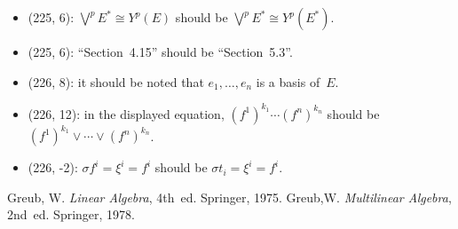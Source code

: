 \documentclass[letterpaper,12pt]{article}
\newcommand{\iso}{\cong}
\newcommand{\smprod}{\vee}
\newcommand{\bigsmprod}{\bigvee}
\begin{document}
\begin{itemize}
\item (225, 6): \(\bigsmprod^p E^*\iso Y^p(E)\) should be \(\bigsmprod^p E^*\iso Y^p(E^*)\).
\item (225, 6): ``Section~4.15'' should be ``Section~5.3''.
\item (226, 8): it should be noted that \(e_1,\ldots,e_n\) is a basis of~\(E\).
\item (226, 12): in the displayed equation, \((f^1)^{k_1}\cdots(f^n)^{k_n}\) should be \((f^1)^{k_1}\smprod\cdots\smprod(f^n)^{k_n}\).
\item (226, -2): \(\sigma f^i=\xi^i=f^i\) should be \(\sigma t_i=\xi^i=f^i\).
\end{itemize}

\begin{thebibliography}{0}
 Greub, W. \textit{Linear Algebra}, 4th~ed. Springer, 1975.
 Greub,W. \textit{Multilinear Algebra}, 2nd~ed. Springer, 1978.
\end{thebibliography}
\end{document}
